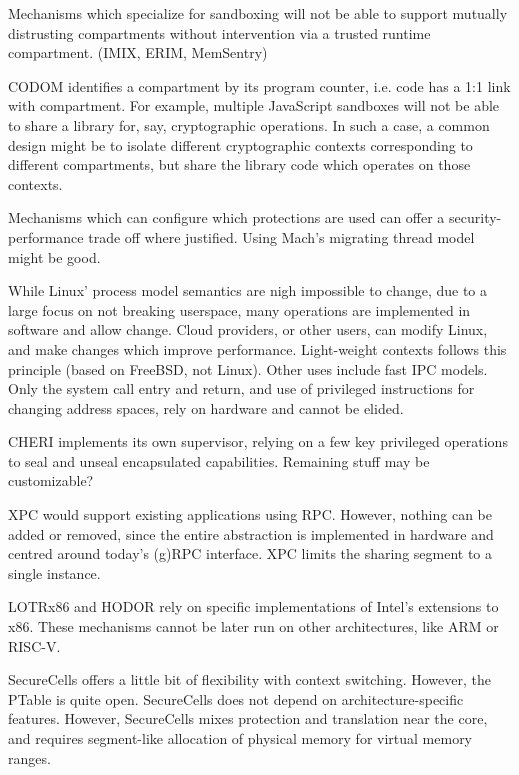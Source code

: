 Mechanisms which specialize for sandboxing will not be able to
support mutually distrusting compartments without intervention via a
trusted runtime compartment.
 (IMIX, ERIM, MemSentry)

CODOM identifies a compartment by its program counter, i.e. code has a
1:1 link with compartment.
For example, multiple JavaScript sandboxes will not be able to share
a library for, say, cryptographic operations.
In such a case, a common design might be to isolate different
cryptographic contexts corresponding to different compartments, but
share the library code which operates on those contexts.

Mechanisms which can configure which protections are used can offer a
security-performance trade off where justified.
Using Mach's migrating thread model might be good.

While Linux' process model semantics are nigh impossible to change, due to
a large focus on not breaking userspace, many operations are implemented
in software and allow change.
Cloud providers, or other users, can modify Linux, and make changes which
improve performance. 
Light-weight contexts follows this principle (based on FreeBSD, not Linux).
Other uses include fast IPC models. 
Only the system call entry and return, and use of privileged instructions
for changing address spaces, rely on hardware and cannot be elided.

CHERI implements its own supervisor, relying on a few key privileged
operations to seal and unseal encapsulated capabilities.
Remaining stuff may be customizable?

XPC would support existing applications using RPC. 
However, nothing can be added or removed, since the entire abstraction
is implemented in hardware and centred around today's (g)RPC interface.
XPC limits the sharing segment to a single instance.

LOTRx86 and HODOR rely on specific implementations of Intel's
extensions to x86. 
These mechanisms cannot be later run on other architectures, like
ARM or RISC-V.

SecureCells offers a little bit of flexibility with context switching.
However, the PTable is quite open.
SecureCells does not depend on architecture-specific features.
However, SecureCells mixes protection and translation near the core,
and requires segment-like allocation of physical memory for virtual
memory ranges.


